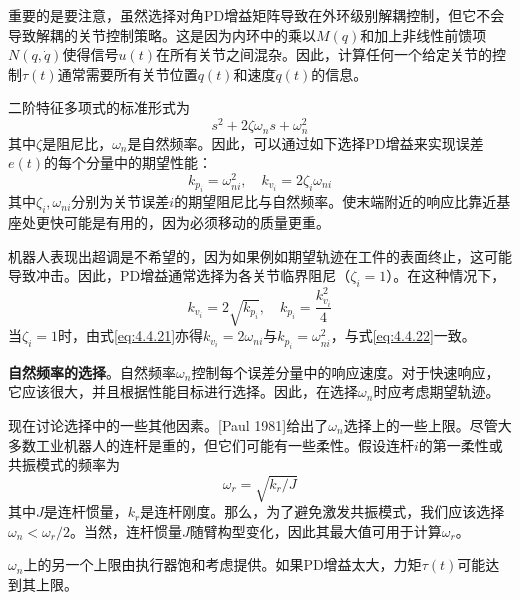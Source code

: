 \documentclass[UTF8]{ctexart}
\theoremstyle{definition}
\begin{document}
重要的是要注意，虽然选择对角PD增益矩阵导致在外环级别解耦控制，但它不会导致解耦的关节控制策略。这是因为内环中的乘以$M(q)$和加上非线性前馈项$N(q, \dot{q})$使得信号$u(t)$在所有关节之间混杂。因此，计算任何一个给定关节的控制$\tau(t)$通常需要所有关节位置$q(t)$和速度$\dot{q}(t)$的信息。

二阶特征多项式的标准形式为
\begin{equation*}
    s^2 + 2\zeta\omega_ns + \omega_n^2
\end{equation*}
其中$\zeta$是阻尼比，$\omega_n$是自然频率。因此，可以通过如下选择PD增益来实现误差$e(t)$的每个分量中的期望性能：
\begin{equation}\label{eq:4.4.21}
    k_{p_i} = \omega_{ni}^2, \quad k_{v_i} = 2\zeta_i\omega_{ni}
\end{equation}
其中$\zeta_i,\omega_{ni}$分别为关节误差$i$的期望阻尼比与自然频率。使末端附近的响应比靠近基座处更快可能是有用的，因为必须移动的质量更重。

机器人表现出超调是不希望的，因为如果例如期望轨迹在工件的表面终止，这可能导致冲击。因此，PD增益通常选择为各关节临界阻尼（$\zeta_i = 1$）。在这种情况下，
\begin{equation}\label{eq:4.4.22}
    k_{v_i} = 2\sqrt{k_{p_i}}, \quad k_{p_i} = \frac{k_{v_i}^2}{4}
\end{equation}
当$\zeta_i=1$时，由式\eqref{eq:4.4.21}亦得$k_{v_i}=2\omega_{ni}$与$k_{p_i}=\omega_{ni}^2$，与式\eqref{eq:4.4.22}一致。

\textbf{自然频率的选择}。自然频率$\omega_n$控制每个误差分量中的响应速度。对于快速响应，它应该很大，并且根据性能目标进行选择。因此，在选择$\omega_n$时应考虑期望轨迹。

现在讨论选择中的一些其他因素。[Paul 1981]给出了$\omega_n$选择上的一些上限。尽管大多数工业机器人的连杆是重的，但它们可能有一些柔性。假设连杆$i$的第一柔性或共振模式的频率为
\begin{equation}\label{eq:4.4.24}
    \omega_r = \sqrt{k_r/J}
\end{equation}
其中$J$是连杆惯量，$k_r$是连杆刚度。那么，为了避免激发共振模式，我们应该选择$\omega_n < \omega_r/2$。当然，连杆惯量$J$随臂构型变化，因此其最大值可用于计算$\omega_r$。

$\omega_n$上的另一个上限由执行器饱和考虑提供。如果PD增益太大，力矩$\tau(t)$可能达到其上限。
\end{document}
